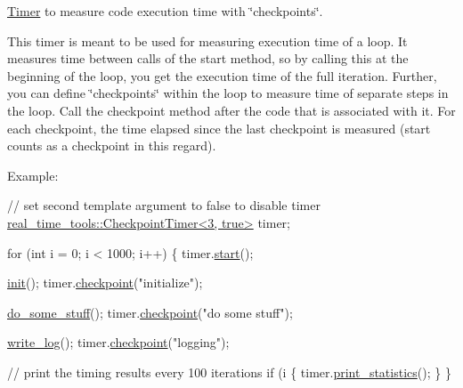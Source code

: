 \hyperlink{classreal__time__tools_1_1Timer}{Timer} to measure code execution time with \char`\"{}checkpoints\char`\"{}. 

This timer is meant to be used for measuring execution time of a loop. It measures time between calls of the {\ttfamily start} method, so by calling this at the beginning of the loop, you get the execution time of the full iteration. Further, you can define \char`\"{}checkpoints\char`\"{} within the loop to measure time of separate steps in the loop. Call the {\ttfamily checkpoint} method after the code that is associated with it. For each checkpoint, the time elapsed since the last checkpoint is measured ({\ttfamily start} counts as a checkpoint in this regard).

Example\+: 
\begin{DoxyCodeInclude}

    \textcolor{comment}{// set second template argument to false to disable timer}
    \hyperlink{classreal__time__tools_1_1CheckpointTimer}{real\_time\_tools::CheckpointTimer<3, true>} timer;

    \textcolor{keywordflow}{for} (\textcolor{keywordtype}{int} i = 0; i < 1000; i++)
    \{
        timer.\hyperlink{classreal__time__tools_1_1CheckpointTimer_ad93a12cb74103528c8db4e7b1745eae6}{start}();

        \hyperlink{demo__checkpoint__timer_8cpp_a02fd73d861ef2e4aabb38c0c9ff82947}{init}();
        timer.\hyperlink{classreal__time__tools_1_1CheckpointTimer_a6e91b61b72c433a220b1bddb7a634bf5}{checkpoint}(\textcolor{stringliteral}{"initialize"});

        \hyperlink{demo__checkpoint__timer_8cpp_acb546a895e868f1a8fb9cb4b5a210f42}{do\_some\_stuff}();
        timer.\hyperlink{classreal__time__tools_1_1CheckpointTimer_a6e91b61b72c433a220b1bddb7a634bf5}{checkpoint}(\textcolor{stringliteral}{"do some stuff"});

        \hyperlink{demo__checkpoint__timer_8cpp_a609e6537df0c7eb15c1f5b4e02fbe0ed}{write\_log}();
        timer.\hyperlink{classreal__time__tools_1_1CheckpointTimer_a6e91b61b72c433a220b1bddb7a634bf5}{checkpoint}(\textcolor{stringliteral}{"logging"});

        \textcolor{comment}{// print the timing results every 100 iterations}
        \textcolor{keywordflow}{if} (i %
        \{
            timer.\hyperlink{classreal__time__tools_1_1CheckpointTimer_a73e001fa40a76ce5fd917a2dfcd09555}{print\_statistics}();
        \}
    \}

\end{DoxyCodeInclude}
 
